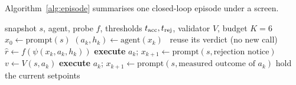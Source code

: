 Algorithm~\ref{alg:episode} summarises one closed-loop episode under a screen.

\begin{algorithm}[!htbp]
\caption{One closed-loop episode with a screen (optional R0 rule)}\label{alg:episode}
\begin{algorithmic}[1]
\Require snapshot $s$, agent, probe $f$, thresholds $t_{\mathrm{acc}},t_{\mathrm{rej}}$, validator $V$, budget $K=6$
\State $x_0\gets\mathrm{prompt}(s)$
  \State $(a_k,h_k)\gets\mathrm{agent}(x_k)$ 
  \ reuse its verdict (no new call) \EndIf
  \State $\hat r\gets f(\psi(x_k,a_k,h_k))$
   \State \textbf{execute} $a_k$; \Return \Comment{\ACC}
   \State $x_{k+1}\gets\mathrm{prompt}(s,\text{rejection notice})$ 
  \Else \State $v\gets V(s,a_k)$ 
     \State \textbf{execute} $a_k$; \Return \EndIf
    \State $x_{k+1}\gets\mathrm{prompt}(s,\text{measured outcome of }a_k)$
  \EndIf
\EndFor
\State hold the current setpoints 
\end{algorithmic}
\end{algorithm}
